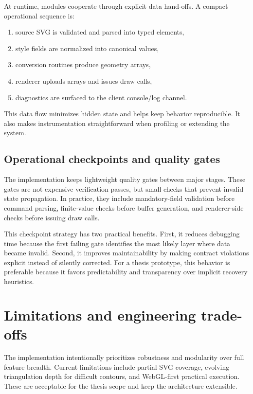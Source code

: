 At runtime, modules cooperate through explicit data hand-offs.
A compact operational sequence is:

\begin{enumerate}
\item source SVG is validated and parsed into typed elements,
\item style fields are normalized into canonical values,
\item conversion routines produce geometry arrays,
\item renderer uploads arrays and issues draw calls,
\item diagnostics are surfaced to the client console/log channel.
\end{enumerate}

This data flow minimizes hidden state and helps keep behavior reproducible.
It also makes instrumentation straightforward when profiling or extending the system.

\subsection{Operational checkpoints and quality gates}

The implementation keeps lightweight quality gates between major stages.
These gates are not expensive verification passes, but small checks that prevent invalid state propagation.
In practice, they include mandatory-field validation before command parsing, finite-value checks before buffer generation, and renderer-side checks before issuing draw calls.

This checkpoint strategy has two practical benefits.
First, it reduces debugging time because the first failing gate identifies the most likely layer where data became invalid.
Second, it improves maintainability by making contract violations explicit instead of silently corrected.
For a thesis prototype, this behavior is preferable because it favors predictability and transparency over implicit recovery heuristics.

\section{Limitations and engineering trade-offs}

The implementation intentionally prioritizes robustness and modularity over full feature breadth.
Current limitations include partial SVG coverage, evolving triangulation depth for difficult contours, and WebGL-first practical execution.
These are acceptable for the thesis scope and keep the architecture extensible.

